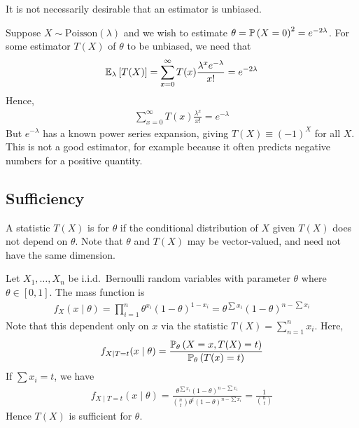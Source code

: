 It is not necessarily desirable that an estimator is unbiased.
\begin{example}
	Suppose $X \sim \mathrm{Poisson}(\lambda)$ and we wish to estimate $\theta = \mathbb{P}\left({X = 0}\right)^2 = e^{-2\lambda}$.
	For some estimator $T(X)$ of $\theta$ to be unbiased, we need that
	\begin{align*}
		\mathbb{E}_{\lambda}\left[{T(X)}\right] = \sum_{x=0}^\infty T(x) \frac{\lambda^x e^{-\lambda}}{x!} = e^{-2\lambda}
	\end{align*}
	Hence,
	\begin{align*}
		\sum_{x=0}^\infty T(x) \frac{\lambda^x}{x!} = e^{-\lambda}
	\end{align*}
	But $e^{-\lambda}$ has a known power series expansion, giving $T(X) \equiv (-1)^X$ for all $X$.
	This is not a good estimator, for example because it often predicts negative numbers for a positive quantity.
\end{example}

\subsection{Sufficiency}
\begin{definition}[Sufficiency]
	A statistic $T(X)$ is  for $\theta$ if the conditional distribution of $X$ given $T(X)$ does not depend on $\theta$.
	Note that $\theta$ and $T(X)$ may be vector-valued, and need not have the same dimension.
\end{definition}

\begin{example}
	Let $X_1, \dots, X_n$ be i.i.d.\ Bernoulli random variables with parameter $\theta$ where $\theta \in [0,1]$.
	The mass function is
	\begin{align*}
		f_X(x \mid \theta) = \prod_{i=1}^n \theta^{x_i}(1-\theta)^{1-x_i} = \theta^{\sum x_i} (1-\theta)^{n - \sum x_i}
	\end{align*}
	Note that this dependent only on $x$ via the statistic $T(X) = \sum_{n=1}^n x_i$.
	Here,
	\begin{align*}
		f_{X \mid T = t}(x \mid \theta) = \frac{\mathbb{P}_{\theta}\left({X = x, T(X) = t}\right)}{\mathbb{P}_{\theta}\left({T(x) = t}\right)}
	\end{align*}
	If $\sum x_i = t$, we have
	\begin{align*}
		f_{X \mid T = t}(x \mid \theta) = \frac{\theta^{\sum x_i} (1-\theta)^{n-\sum x_i}}{\binom{n}{t} \theta^t (1-\theta)^{n-\sum x_i}} = \frac{1}{\binom{n}{t}}
	\end{align*}
	Hence $T(X)$ is sufficient for $\theta$.
\end{example}

